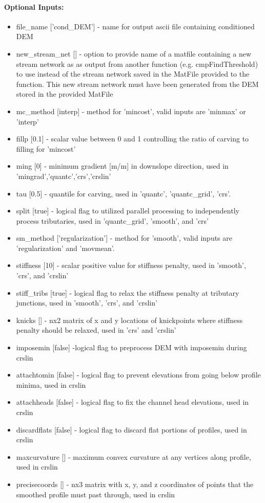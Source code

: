 \paragraph{Optional Inputs:}
\begin{itemize}
\item file\_name ['cond\_DEM'] - name for output ascii file containing conditioned DEM
\item new\_stream\_net [] - option to provide name of a matfile containing a new stream network as as output from another function (e.g. cmpFindThreshold) to use
instead of the stream network saved in the MatFile provided to the function. This new stream network must have been generated from the
DEM stored in the provided MatFile
\item mc\_method [interp] - method for 'mincost', valid inputs are 'minmax' or 'interp'
\item fillp [0.1] - scalar value between 0 and 1 controlling the ratio of carving to filling for 'mincost'
\item ming [0] - minimum gradient [m/m] in downslope direction, used in 'mingrad','quantc','crs','crslin'
\item tau [0.5] - quantile for carving, used in 'quantc', 'quantc\_grid', 'crs'.
\item split [true] - logical flag to utilized parallel processing to independently process tributaries, used in 'quantc\_grid', 'smooth', and 'crs'
\item sm\_method ['regularization'] - method for 'smooth', valid inputs are 'regularization' and 'movmean'. 
\item stiffness [10] - scalar positive value for stiffness penalty, used in 'smooth', 'crs', and 'crslin'
\item stiff\_tribs [true] - logical flag to relax the stiffness penalty at tributary junctions, used in 'smooth', 'crs', and 'crslin'
\item knicks [] - nx2 matrix of x and y locations of knickpoints where stiffness penalty should be relaxed, used in 'crs' and 'crslin'
\item imposemin [false] -logical flag to preprocess DEM with imposemin during crslin
\item attachtomin [false] - logical flag to prevent elevations from going below profile minima, used in crslin
\item attachheads [false] - logical flag to fix the channel head elevations, used in crslin
\item discardflats [false] - logical flag to discard flat portions of profiles, used in crslin
\item maxcurvature [] - maximum convex curvature at any vertices along profile, used in crslin
\item precisecoords [] - nx3 matrix with x, y, and z coordinates of points that the smoothed profile must past through, used in crslin
\end{itemize}

